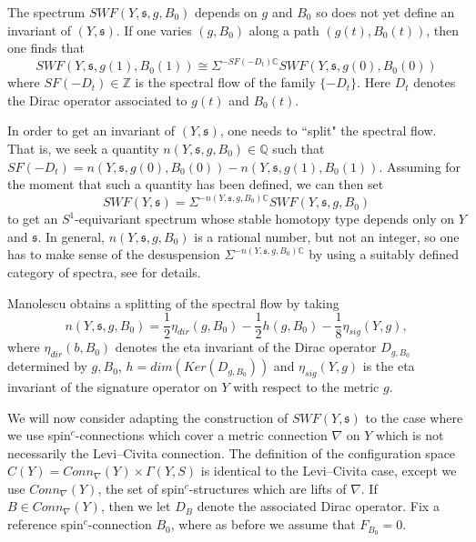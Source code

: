 \documentclass{amsart}
\theoremstyle{definition}
\theoremstyle{remark}
\numberwithin{equation}{section}
\begin{document}
The spectrum $SWF(Y , \mathfrak{s} , g , B_0)$ depends on $g$ and $B_0$ so does not yet define an invariant of $(Y , \mathfrak{s})$. If one varies $(g,B_0)$ along a path $(g(t) , B_0(t))$, then one finds that
\[
SWF( Y , \mathfrak{s} , g(1) , B_0(1) ) \cong \Sigma^{-SF(-D_t) \mathbb{C}} SWF(Y , \mathfrak{s} , g(0) , B_0(0))
\]
where $SF(-D_t) \in \mathbb{Z}$ is the spectral flow of the family $\{-D_t\}$. Here $D_t$ denotes the Dirac operator associated to $g(t)$ and $B_0(t)$.

In order to get an invariant of $(Y , \mathfrak{s})$, one needs to ``split" the spectral flow. That is, we seek a quantity $n(Y , \mathfrak{s}, g , B_0) \in \mathbb{Q}$ such that $SF(-D_t) = n(Y , \mathfrak{s} , g(0) , B_0(0)) - n(Y , \mathfrak{s} , g(1) , B_0(1))$. Assuming for the moment that such a quantity has been defined, we can then set
\[
SWF(Y , \mathfrak{s}) = \Sigma^{-n(Y,\mathfrak{s} , g , B_0) \mathbb{C}} SWF(Y , \mathfrak{s} , g , B_0)
\]
to get an $S^1$-equivariant spectrum whose stable homotopy type depends only on $Y$ and $\mathfrak{s}$. In general, $n(Y , \mathfrak{s} , g , B_0)$ is a rational number, but not an integer, so one has to make sense of the desuspension $\Sigma^{-n(Y,\mathfrak{s},g,B_0)\mathbb{C}}$ by using a suitably defined category of spectra, see \cite[]{man} for details.

Manolescu obtains a splitting of the spectral flow by taking
\begin{equation}\label{equ:nlc}
n(Y , \mathfrak{s} , g , B_0) = \frac{1}{2}\eta_{dir}(g,B_0) - \frac{1}{2}h(g,B_0) - \frac{1}{8}\eta_{sig}(Y,g),
\end{equation}
where $\eta_{dir}(b,B_0)$ denotes the eta invariant of the Dirac operator $D_{g,B_0}$ determined by $g,B_0$, $h = dim(Ker(D_{g,B_0}))$ and $\eta_{sig}(Y,g)$ is the eta invariant of the signature operator on $Y$ with respect to the metric $g$.

We will now consider adapting the construction of $SWF(Y , \mathfrak{s})$ to the case where we use spin$^c$-connections which cover a metric connection $\nabla$ on $Y$ which is not necessarily the Levi--Civita connection. The definition of the configuration space $C(Y) = Conn_\nabla(Y) \times \Gamma(Y , S)$ is identical to the Levi--Civita case, except we use $Conn_\nabla(Y)$, the set of spin$^c$-structures which are lifts of $\nabla$. If $B \in Conn_\nabla(Y)$, then we let $D_B$ denote the associated Dirac operator. Fix a reference spin$^c$-connection $B_0$, where as before we assume that $F_{B_0} = 0$.
\end{document}
